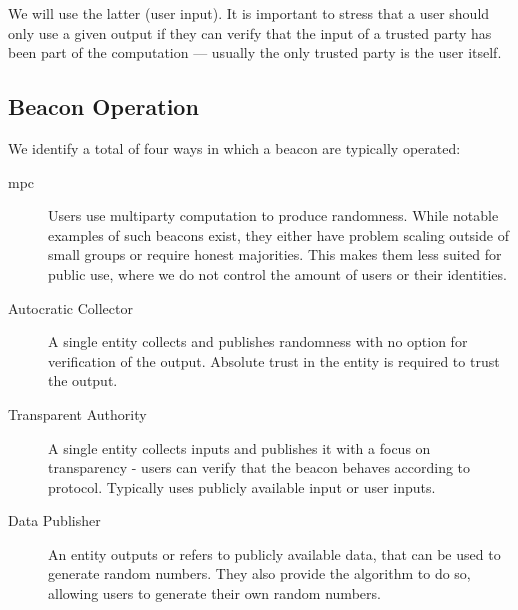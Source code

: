 We will use the latter (user input).
It is important to stress that a user should only use a given output if they can verify that the input of a trusted party has been part of the computation --- usually the only trusted party is the user itself.


\subsection{Beacon Operation}
We identify a total of four ways in which a beacon are typically operated: 

\begin{description}
    \item [\gls{mpc}] Users use multiparty computation to produce randomness. While notable examples of such beacons exist, they either have problem scaling outside of small groups or require honest majorities. This makes them less suited for public use, where we do not control the amount of users or their identities. 
    \item [Autocratic Collector] A single entity collects and publishes randomness with no option for verification of the output. Absolute trust in the entity is required to trust the output. 
    \item [Transparent Authority] A single entity collects inputs and publishes it with a focus on transparency - users can verify that the beacon behaves according to protocol. Typically uses publicly available input or user inputs. 
    \item [Data Publisher] An entity outputs or refers to publicly available data, that can be used to generate random numbers. They also provide the algorithm to do so, allowing users to generate their own random numbers. 
\end{description}